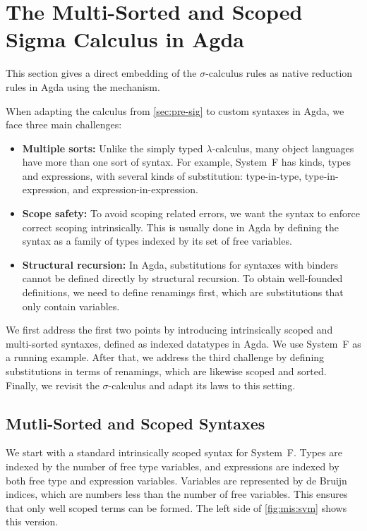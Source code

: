 \documentclass[screen,nonacm]{acmart}
\begin{document}
\section{The Multi-Sorted and Scoped Sigma Calculus in Agda}\label{sec:mis}

This section gives a direct embedding of the $\sigma$-calculus rules as native
reduction rules in Agda using the  mechanism.

When adapting the calculus from \cref{sec:pre-sig} to custom syntaxes in Agda,
we face three main challenges:

\begin{itemize}
      \item \textbf{Multiple sorts:} Unlike the simply typed $\lambda$-calculus, many
            object languages have more than one sort of syntax. For example, System~F
            has kinds, types and expressions, with several kinds of substitution: type-in-type,
            type-in-expression, and expression-in-expression.

      \item \textbf{Scope safety:} To avoid scoping related errors, we want the
            syntax to enforce correct scoping intrinsically. This is usually done in Agda by
            defining the syntax as a family of types indexed by its set of free variables.

      \item \textbf{Structural recursion:} In Agda, substitutions for syntaxes with binders
            cannot be defined directly by structural recursion.
            To obtain well-founded definitions, we need to define renamings first, which are
            substitutions that only contain variables.
\end{itemize}

We first address the first two points by introducing intrinsically scoped and
multi-sorted syntaxes, defined as indexed datatypes in Agda. We use System~F as
a running example. After that, we address the third challenge by defining
substitutions in terms of renamings, which are likewise scoped and sorted.
Finally, we revisit the $\sigma$-calculus and adapt its laws to this setting.

\subsection{Mutli-Sorted and Scoped Syntaxes}\label{sec:mis-sub}

We start with a standard intrinsically scoped syntax for System~F. Types are
indexed by the number of free type variables, and expressions are indexed by
both free type and expression variables. Variables are represented by de Bruijn
indices, which are numbers less than the number of free variables. This ensures
that only well scoped terms can be formed. The left side of \cref{fig:mis:svm}
shows this version.
\end{document}
